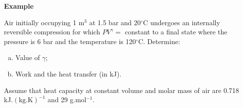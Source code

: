    \begin{MyExample}{\begin{center}{\bf Example}\end{center}}
     \begin{example}\label{Chapter:FirstLaw:Example8}\citep{Rajput_Book}
       Air initially occupying 1 m$^{3}$ at 1.5 bar and 20$^{\circ}$C undergoes an internally reversible compression for which $P V^{\gamma}=$ constant to a final state where the pressure is 6 bar and the temperature is 120$^{\circ}$C. Determine:
        \begin{enumerate}[(a)]
           \item Value of $\gamma$;
           \item Work and the heat transfer (in kJ).
       \end{enumerate}
       Assume that heat capacity at constant volume and molar mass of air are 0.718 kJ.$\left(\text{kg.K}\right)^{-1}$ and 29 g.mol$^{-1}$.
     \end{example}


\end{MyExample}
